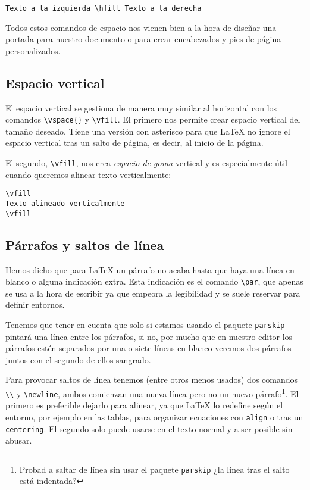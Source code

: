 \begin{lstlisting}
Texto a la izquierda \hfill Texto a la derecha
\end{lstlisting}

Todos estos comandos de espacio nos vienen bien a la hora de diseñar una
portada para nuestro documento o para crear encabezados y pies de página
personalizados.

\subsection{Espacio vertical}\label{espacio-vertical}

El espacio vertical se gestiona de manera muy similar al horizontal con
los comandos \lstinline!\vspace{}! y \lstinline!\vfill!. El primero nos
permite crear espacio vertical del tamaño deseado. Tiene una versión con
asterisco para que LaTeX no ignore el espacio vertical tras un salto de
página, es decir, al inicio de la página.

El segundo, \lstinline!\vfill!, nos crea \emph{espacio de goma} vertical
y es especialmente útil
\href{http://tex.stackexchange.com/questions/2326/vertically-center-text-on-a-page}{cuando
queremos alinear texto verticalmente}:

\begin{lstlisting}
\vfill
Texto alineado verticalmente
\vfill
\end{lstlisting}

\subsection{Párrafos y saltos de
línea}\label{puxe1rrafos-y-saltos-de-luxednea}

Hemos dicho que para LaTeX un párrafo no acaba hasta que haya una línea
en blanco o alguna indicación extra. Esta indicación es el comando
\lstinline!\par!, que apenas se usa a la hora de escribir ya que empeora
la legibilidad y se suele reservar para definir entornos.

Tenemos que tener en cuenta que solo si estamos usando el paquete
\lstinline!parskip! pintará una línea entre los párrafos, si no, por
mucho que en nuestro editor los párrafos estén separados por una o siete
líneas en blanco veremos dos párrafos juntos con el segundo de ellos
sangrado.

Para provocar saltos de línea tenemos (entre otros menos usados) dos
comandos \lstinline!\\! y \lstinline!\newline!, ambos comienzan una
nueva línea pero no un nuevo párrafo\footnote{Probad a saltar de línea
  sin usar el paquete \lstinline!parskip! ¿la línea tras el salto está
  indentada?}. El primero es preferible dejarlo para alinear, ya que
LaTeX lo redefine según el entorno, por ejemplo en las tablas, para
organizar ecuaciones con \lstinline!align! o tras un
\lstinline!centering!. El segundo solo puede usarse en el texto normal y
a ser posible sin abusar.

